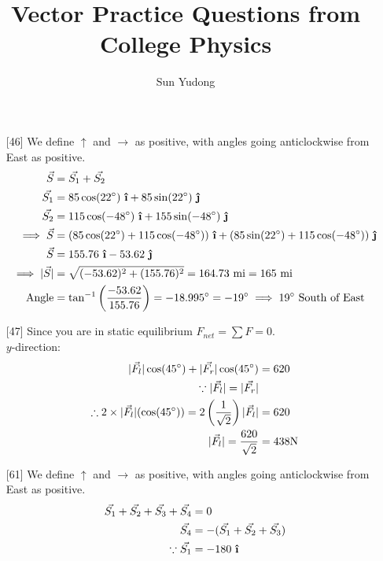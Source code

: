 \documentclass[11pt]{article}
\title{Vector Practice Questions from College Physics}
\author{Sun Yudong}
\newcommand{\uvec}[1]{\boldsymbol{\hat{\textbf{#1}}}}
\begin{document}
	\maketitle
	
	\begin{enumerate}
		\item[{[46]}] We define $\uparrow$ and $\rightarrow$ as positive, with angles going anticlockwise from East as positive.
			\begin{align*}
				\vec{S} &= \vec{S_1}+\vec{S_2} 	\\
				\vec{S_1} &= 85\cos(22\degree)~\uvec{\i} + 85\sin(22\degree)~\uvec{\j} \\
				\vec{S_2} &= 115\cos(-48\degree)~\uvec{\i} + 155\sin(-48\degree)~\uvec{\j} \\
				\implies \vec{S} &= (85\cos(22\degree) + 115\cos(-48\degree))~\uvec{\i} + (85\sin(22\degree) + 115\cos(-48\degree))~\uvec{\j} \\
				\vec{S} &= 155.76~\uvec{\i} - 53.62~\uvec{\j} \\
				\implies |\vec{S}| &= \sqrt{(-53.62)^2+(155.76)^2} = 164.73 ~\text{mi} = 165 ~\text{mi} \\
				\text{Angle} &= \tan^{-1} \left(\frac{-53.62}{155.76}\right) = -18.995 \degree = -19 \degree \implies 19 \degree ~\text{South of East}
			\end{align*}
		\vfill
		\item[{[47]}] Since you are in static equilibrium $F_{net} = \sum F = 0$. \\
		$y$-direction:
			\begin{align*}
				|\vec{F_l}|\cos(45\degree) + |\vec{F_r}|\cos(45\degree) &= 620 \\
				\because |\vec{F_l}| = |\vec{F_r}| \\
				\therefore 2\times|\vec{F_l}|(\cos(45\degree)) = 2\left(\frac{1}{\sqrt{2}}\right)|\vec{F_l}|  &=620 \\
				|\vec{F_l}| = \frac{620}{\sqrt{2}} &= 438\text{N}
			\end{align*}
		\vfill
		\item[{[61]}] We define $\uparrow$ and $\rightarrow$ as positive, with angles going anticlockwise from East as positive.
			\begin{align*}
				\vec{S_1} + \vec{S_2} + \vec{S_3} + \vec{S_4} &= 0 \\ 
				\vec{S_4} &= -(\vec{S_1} + \vec{S_2} + \vec{S_3}) \\
				\because \vec{S_1} &= -180 ~\uvec{\i} \\

\end{align*}
\end{enumerate}
\end{document}
